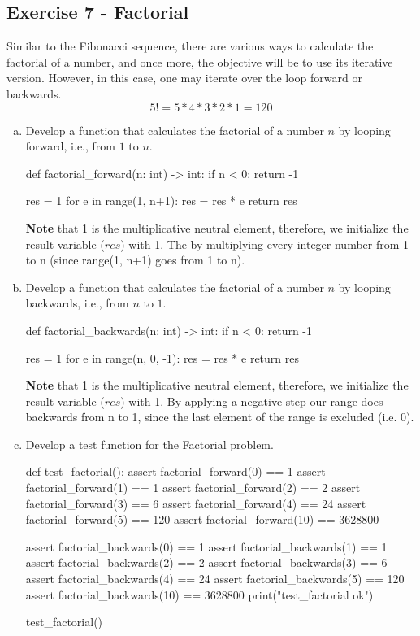\documentclass[12pt]{article}
\begin{document}
\subsection*{Exercise 7 - Factorial}
Similar to the Fibonacci sequence, there are various ways to calculate the
factorial of a number, and once more, the objective will be to use its iterative
version. However, in this case, one may iterate over the loop forward or 
backwards.
\[5! = 5 * 4 * 3 * 2 * 1 = 120\]
\begin{enumerate}[a)]
  \item Develop a function that calculates the factorial of a number $n$ by 
    looping forward, i.e., from $1$ to $n$.
  \newpage
  \begin{pythonlst}
def factorial_forward(n: int) -> int:
  if n < 0:
    return -1

  res = 1
  for e in range(1, n+1):
    res = res * e
  return res
  \end{pythonlst}
  \textbf{Note} that 1 is the multiplicative neutral element, therefore, we
  initialize the result variable ($res$) with 1. The by multiplying every 
  integer number from 1 to n (since range(1, n+1) goes from 1 to n).
  \item Develop a function that calculates the factorial of a number $n$ by 
    looping backwards, i.e., from $n$ to $1$.
    \begin{pythonlst}
def factorial_backwards(n: int) -> int:
  if n < 0:
    return -1

  res = 1
  for e in range(n, 0, -1):
    res = res * e
  return res
    \end{pythonlst}
    \textbf{Note} that 1 is the multiplicative neutral element, therefore, we
    initialize the result variable ($res$) with 1. By applying a negative step
    our range does backwards from n to 1, since the last element of the range
    is excluded (i.e. $0$).
  \item Develop a test function for the Factorial problem.
  \begin{pythonlst}
def test_factorial():
  assert factorial_forward(0) == 1
  assert factorial_forward(1) == 1
  assert factorial_forward(2) == 2
  assert factorial_forward(3) == 6
  assert factorial_forward(4) == 24
  assert factorial_forward(5) == 120
  assert factorial_forward(10) == 3628800

  assert factorial_backwards(0) == 1
  assert factorial_backwards(1) == 1
  assert factorial_backwards(2) == 2
  assert factorial_backwards(3) == 6
  assert factorial_backwards(4) == 24
  assert factorial_backwards(5) == 120
  assert factorial_backwards(10) == 3628800
  print("test_factorial ok")
  
test_factorial()
  \end{pythonlst}
\end{enumerate}
\end{document}
